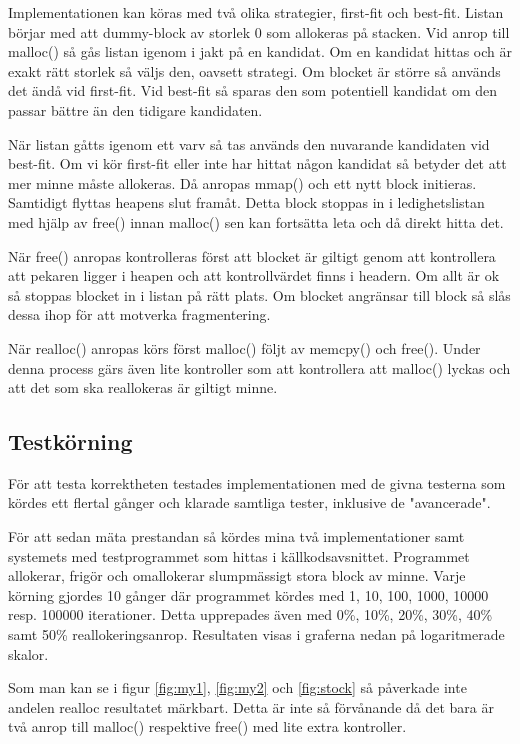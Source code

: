 \documentclass[10pt,a4paper]{article}
\begin{document}
Implementationen kan köras med två olika strategier, first-fit och best-fit. Listan börjar med att dummy-block av storlek 0 som allokeras på stacken. Vid anrop till malloc() så gås listan igenom i jakt på en kandidat. Om en kandidat hittas och är exakt rätt storlek så väljs den, oavsett strategi. Om blocket är större så används det ändå vid first-fit. Vid best-fit så sparas den som potentiell kandidat om den passar bättre än den tidigare kandidaten.

När listan gåtts igenom ett varv så tas används den nuvarande kandidaten vid best-fit. Om vi kör first-fit eller inte har hittat någon kandidat så betyder det att mer minne måste allokeras. Då anropas mmap() och ett nytt block initieras. Samtidigt flyttas heapens slut framåt. Detta block stoppas in i ledighetslistan med hjälp av free() innan malloc() sen kan fortsätta leta och då direkt hitta det.

När free() anropas kontrolleras först att blocket är giltigt genom att kontrollera att pekaren ligger i heapen och att kontrollvärdet finns i headern. Om allt är ok så stoppas blocket in i listan på rätt plats. Om blocket angränsar till block så slås dessa ihop för att motverka fragmentering.

När realloc() anropas körs först malloc() följt av memcpy() och free(). Under denna process gärs även lite kontroller som att kontrollera att malloc() lyckas och att det som ska reallokeras är giltigt minne.

\clearpage
\subsection{Testkörning}

För att testa korrektheten testades implementationen med de givna testerna som kördes ett flertal gånger och klarade samtliga tester, inklusive de "avancerade".

För att sedan mäta prestandan så kördes mina två implementationer samt systemets med testprogrammet som hittas i källkodsavsnittet. Programmet allokerar, frigör och omallokerar slumpmässigt stora block av minne. Varje körning gjordes 10 gånger där programmet kördes med 1, 10, 100, 1000, 10000 resp. 100000 iterationer. Detta upprepades även med 0\%, 10\%, 20\%, 30\%, 40\% samt 50\% reallokeringsanrop. Resultaten visas i graferna nedan på logaritmerade skalor.

Som man kan se i figur \ref{fig:my1}, \ref{fig:my2} och \ref{fig:stock} så påverkade inte andelen realloc resultatet märkbart. Detta är inte så förvånande då det bara är två anrop till malloc() respektive free() med lite extra kontroller.
\end{document}

